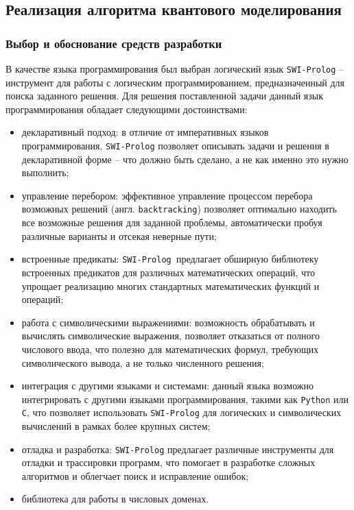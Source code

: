\subsection{Реализация алгоритма квантового моделирования}

\subsubsection{Выбор и обоснование средств разработки}

В качестве языка программирования был выбран логический язык \texttt{SWI-Prolog}\cite{prolog} -- инструмент для работы с логическим программированием, предназначенный для поиска заданного решения. Для решения поставленной задачи данный язык программирования обладает следующими достоинствами:

\begin{itemize}[label=---]
	\item декларативный подход: в отличие от императивных языков программирования, \texttt{SWI-Prolog} позволяет описывать задачи и решения в декларативной форме -- что должно быть сделано, а не как именно это нужно выполнить;
	
	\item управление перебором: эффективное управление процессом перебора возможных решений (англ. \texttt{backtracking}) позволяет оптимально находить все возможные решения для заданной проблемы, автоматически пробуя различные варианты и отсекая неверные пути;
	
	\item встроенные предикаты: \texttt{SWI-Prolog }предлагает обширную библиотеку встроенных предикатов для различных математических операций, что упрощает реализацию многих стандартных математических функций и операций;
	
	\item работа с символическими выражениями: возможность обрабатывать и вычислять символические выражения, позволяет отказаться от полного числового ввода, что полезно для математических формул, требующих символического вывода, а не только численного решения;
	
	\item интеграция с другими языками и системами: данный языка возможно интегрировать с другими языками программирования, такими как \texttt{Python} или \texttt{C}, что позволяет использовать \texttt{SWI-Prolog} для логических и символических вычислений в рамках более крупных систем;
	
	\item отладка и разработка: \texttt{SWI-Prolog} предлагает различные инструменты для отладки и трассировки программ, что помогает в разработке сложных алгоритмов и облегчает поиск и исправление ошибок;
	
	\item библиотека для работы в числовых доменах\cite{prolog-clpfg}.
\end{itemize}

